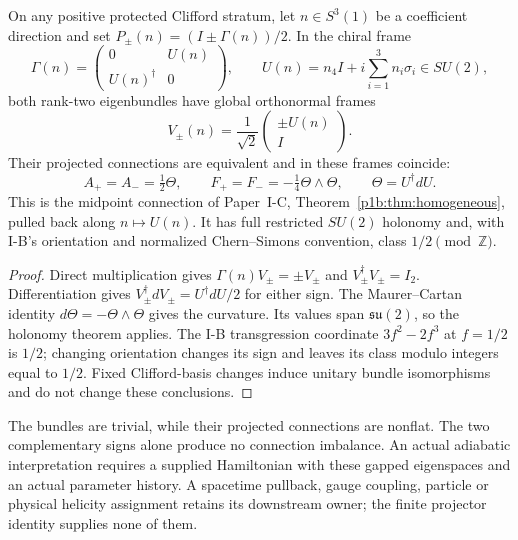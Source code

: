 \documentclass[12pt,a4paper]{article}
\begin{document}
\begin{theorem}
\label{p2c:thm:protected-projector-midpoint}
On any positive protected Clifford stratum, let $n\in S^3(1)$ be a
coefficient direction and set $P_\pm(n)=(I\pm\Gamma(n))/2$.
In the chiral frame
\[
 \Gamma(n)=\begin{pmatrix}0&U(n)\\U(n)^\dagger&0\end{pmatrix},
 \qquad U(n)=n_4I+i\sum_{i=1}^3 n_i\sigma_i\in SU(2),
\]
both rank-two eigenbundles have global orthonormal frames
\[
 V_\pm(n)=\frac1{\sqrt2}\begin{pmatrix}\pm U(n)\\I\end{pmatrix}.
\]
Their projected connections are equivalent and in these frames coincide:
\[
 \boxed{A_+=A_-=\tfrac12\Theta},\qquad
 \boxed{F_+=F_-=-\tfrac14\Theta\wedge\Theta},\qquad
 \Theta=U^\dagger dU.
\]
This is the midpoint connection of Paper~I-C,
Theorem~\ref{p1b:thm:homogeneous}, pulled back along $n\mapsto U(n)$.
It has full restricted $SU(2)$ holonomy and, with I-B's orientation and
normalized Chern--Simons convention, class $1/2\pmod{\mathbb Z}$.
\end{theorem}
\begin{proof}
Direct multiplication gives $\Gamma(n)V_\pm=\pm V_\pm$ and
$V_\pm^\dagger V_\pm=I_2$.  Differentiation gives
$V_\pm^\dagger dV_\pm=U^\dagger dU/2$ for either sign.
The Maurer--Cartan identity $d\Theta=-\Theta\wedge\Theta$ gives the
curvature.  Its values span $\mathfrak{su}(2)$, so the holonomy theorem
applies.  The I-B transgression coordinate $3f^2-2f^3$ at $f=1/2$
is $1/2$; changing orientation changes its sign and leaves its class modulo
integers equal to $1/2$.  Fixed Clifford-basis changes induce unitary bundle
isomorphisms and do not change these conclusions.
\end{proof}
The bundles are trivial, while their projected connections are nonflat.
The two complementary signs alone produce no connection imbalance.
An actual adiabatic interpretation requires a supplied Hamiltonian with
these gapped eigenspaces and an actual parameter history.  A spacetime
pullback, gauge coupling, particle or physical helicity assignment retains
its downstream owner; the finite projector identity supplies none of them.
\end{document}

